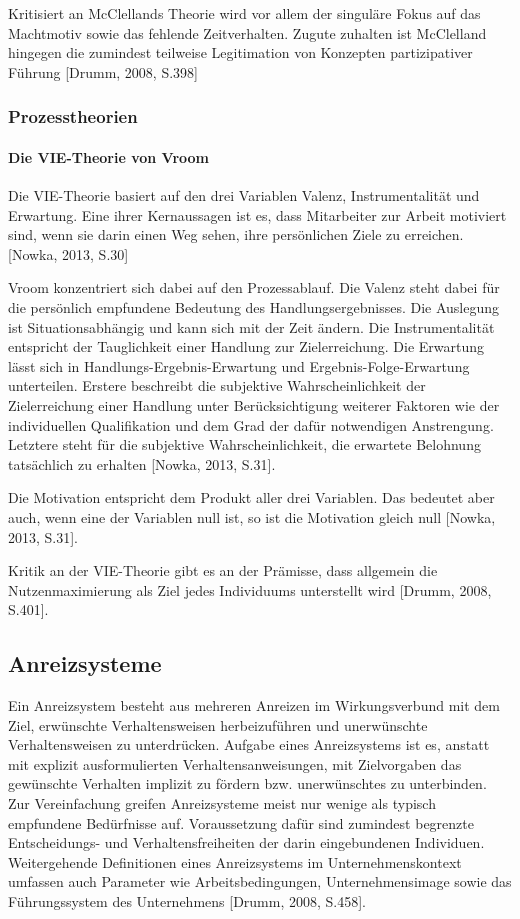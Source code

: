 Kritisiert an McClellands Theorie wird vor allem der singuläre Fokus auf das Machtmotiv sowie das fehlende Zeitverhalten. Zugute zuhalten ist McClelland hingegen die zumindest teilweise Legitimation von Konzepten partizipativer Führung [Drumm, 2008, S.398]

\subsubsection{Prozesstheorien}
\paragraph{Die VIE-Theorie von Vroom}
Die VIE-Theorie basiert auf den drei Variablen Valenz, Instrumentalität und Erwartung. Eine ihrer Kernaussagen ist es, dass Mitarbeiter zur Arbeit motiviert sind, wenn sie darin einen Weg sehen, ihre persönlichen Ziele zu erreichen. [Nowka, 2013, S.30]
 
Vroom konzentriert sich dabei auf den Prozessablauf. Die Valenz steht dabei für die \glqq […] persönlich empfundene Bedeutung des Handlungsergebnisses\grqq [Nowka, 2013, S.31]. Die Auslegung ist Situationsabhängig und kann sich mit der Zeit ändern. Die Instrumentalität entspricht der Tauglichkeit einer Handlung zur Zielerreichung. Die Erwartung lässt sich in Handlungs-Ergebnis-Erwartung und Ergebnis-Folge-Erwartung unterteilen.
Erstere beschreibt die subjektive Wahrscheinlichkeit der Zielerreichung einer Handlung unter Berücksichtigung weiterer Faktoren wie der individuellen Qualifikation und dem Grad der dafür notwendigen Anstrengung.
Letztere steht für die subjektive Wahrscheinlichkeit, die erwartete Belohnung tatsächlich zu erhalten [Nowka, 2013, S.31].
 
Die Motivation entspricht dem Produkt aller drei Variablen. Das bedeutet aber auch, wenn eine der Variablen null ist, so ist die Motivation gleich null [Nowka, 2013, S.31].
 
Kritik an der VIE-Theorie gibt es an der Prämisse, dass allgemein die Nutzenmaximierung als Ziel jedes Individuums unterstellt wird [Drumm, 2008, S.401].

\subsection{Anreizsysteme}
Ein Anreizsystem besteht aus mehreren Anreizen im Wirkungsverbund mit dem Ziel, erwünschte Verhaltensweisen herbeizuführen und unerwünschte Verhaltensweisen zu unterdrücken. Aufgabe eines Anreizsystems ist es, anstatt mit explizit ausformulierten Verhaltensanweisungen, mit Zielvorgaben das gewünschte Verhalten implizit zu fördern bzw. unerwünschtes zu unterbinden. Zur Vereinfachung greifen Anreizsysteme meist nur wenige als typisch empfundene Bedürfnisse auf. Voraussetzung dafür sind zumindest begrenzte Entscheidungs- und Verhaltensfreiheiten der darin eingebundenen Individuen. Weitergehende Definitionen eines Anreizsystems im Unternehmenskontext umfassen auch Parameter wie Arbeitsbedingungen, Unternehmensimage sowie das Führungssystem des Unternehmens [Drumm, 2008, S.458].

